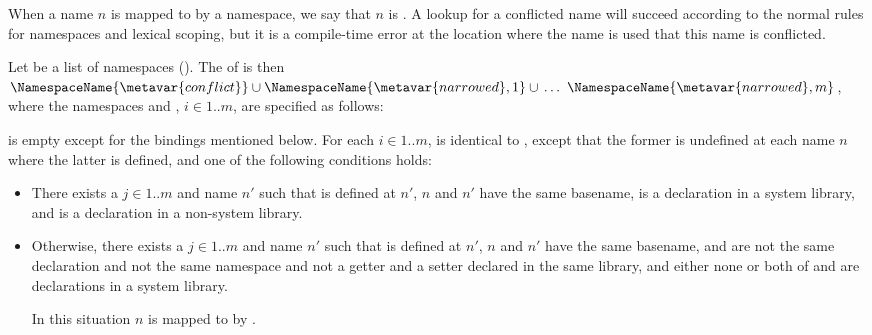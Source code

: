 \documentclass[makeidx]{article}
\begin{document}
\LMHash{}%
When a name $n$ is mapped to \ConflictValue{} by a namespace,
we say that $n$ is
.
A lookup for a conflicted name will succeed according to
the normal rules for namespaces and lexical scoping,
but it is a compile-time error at the location where the name is used
that this name is conflicted.

\LMHash{}%
Let  be a list of namespaces
().
The
of  is then
$\NamespaceName{\metavar{conflict}} \cup
\NamespaceName{\metavar{narrowed},1} \cup\,
\ldots\ \NamespaceName{\metavar{narrowed},m}$,
where the namespaces  and
, $i \in 1 .. m$,
are specified as follows:

\LMHash{}%
 is empty except for the
bindings mentioned below.
For each $i \in 1 .. m$,
 is identical to ,
except that the former is undefined at each name $n$ where
the latter is defined,
and one of the following conditions holds:

\begin{itemize}
\item There exists a $j \in 1 .. m$ and name $n'$ such that
   is defined at $n'$,
  $n$ and $n'$ have the same basename,
   is a declaration in a system library,
  and  is a declaration in a non-system library.
\item Otherwise, there exists a $j \in 1 .. m$ and name $n'$ such that
   is defined at $n'$,
  $n$ and $n'$ have the same basename,
   and  are not the same declaration
  and not the same namespace
  and not a getter and a setter declared in the same library,
  and either none or both of
   and 
  are declarations in a system library.

  In this situation $n$ is mapped to \ConflictValue{}
  by .
\end{itemize}
\end{document}
